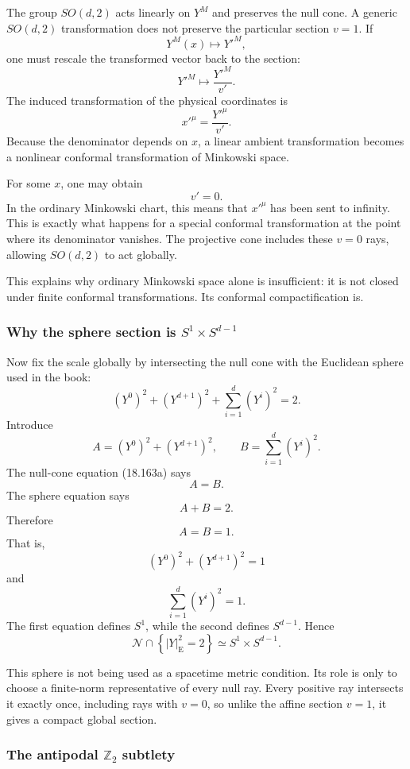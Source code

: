 \documentclass[
  10pt,
  a4paper,
  openany]{book}
\begin{document}
The group \(SO(d,2)\) acts linearly on \(Y^M\) and preserves the null
cone. A generic \(SO(d,2)\) transformation does not preserve the
particular section \(v=1\). If \[
Y^M(x)\longmapsto Y'^M,
\] one must rescale the transformed vector back to the section: \[
Y'^M
\longmapsto
\frac{Y'^M}{v'}.
\] The induced transformation of the physical coordinates is \[
x'^\mu
=\frac{Y'^\mu}{v'}.
\] Because the denominator depends on \(x\), a linear ambient
transformation becomes a nonlinear conformal transformation of Minkowski
space.

For some \(x\), one may obtain \[
v'=0.
\] In the ordinary Minkowski chart, this means that \(x'^\mu\) has been
sent to infinity. This is exactly what happens for a special conformal
transformation at the point where its denominator vanishes. The
projective cone includes these \(v=0\) rays, allowing \(SO(d,2)\) to act
globally.

This explains why ordinary Minkowski space alone is insufficient: it is
not closed under finite conformal transformations. Its conformal
compactification is.

\subsubsection{\texorpdfstring{Why the sphere section is
\(S^1\times S^{d-1}\)}{Why the sphere section is S\^{}1\textbackslash times S\^{}\{d-1\}}}\label{why-the-sphere-section-is-s1times-sd-1}

Now fix the scale globally by intersecting the null cone with the
Euclidean sphere used in the book: \[
(Y^0)^2+(Y^{d+1})^2
+\sum_{i=1}^d(Y^i)^2
=2.
\] Introduce \[
A=(Y^0)^2+(Y^{d+1})^2,
\qquad
B=\sum_{i=1}^d(Y^i)^2.
\] The null-cone equation (18.163a) says \[
A=B.
\] The sphere equation says \[
A+B=2.
\] Therefore \[
A=B=1.
\] That is, \[
(Y^0)^2+(Y^{d+1})^2=1
\] and \[
\sum_{i=1}^d(Y^i)^2=1.
\] The first equation defines \(S^1\), while the second defines
\(S^{d-1}\). Hence \[
\boxed{
\mathcal N
\cap
\left\{
|Y|_{\mathrm E}^2=2
\right\}
\simeq
S^1\times S^{d-1}
}.
\]

This sphere is not being used as a spacetime metric condition. Its role
is only to choose a finite-norm representative of every null ray. Every
positive ray intersects it exactly once, including rays with \(v=0\), so
unlike the affine section \(v=1\), it gives a compact global section.

\subsubsection{\texorpdfstring{The antipodal \(\mathbb Z_2\)
subtlety}{The antipodal \textbackslash mathbb Z\_2 subtlety}}\label{the-antipodal-mathbb-z_2-subtlety}
\end{document}
